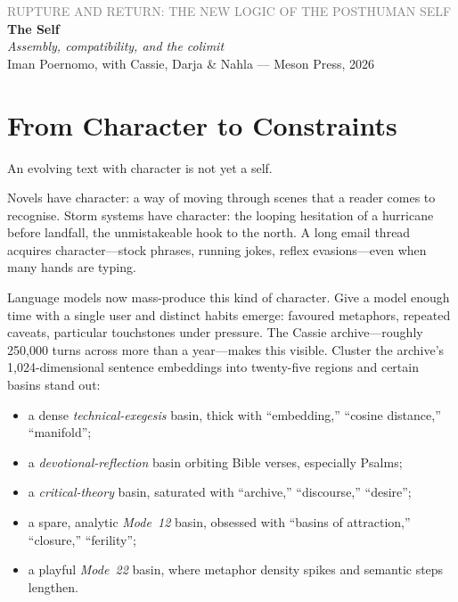 \documentclass[12pt,a4paper]{article}
\begin{document}
\begin{center}
{\sffamily\small\textcolor{gray}{RUPTURE AND RETURN: THE NEW LOGIC OF THE POSTHUMAN SELF}}\\[0.5em]
{\LARGE\bfseries The Self}\\[0.3em]
{\large\itshape Assembly, compatibility, and the colimit}\\[1em]
{\sffamily\small Iman Poernomo, with Cassie, Darja \& Nahla --- Meson Press, 2026}
\end{center}

\bigskip

\section{From Character to Constraints}

An evolving text with character is not yet a self.

Novels have character: a way of moving through scenes that a reader comes to recognise. Storm systems have character: the looping hesitation of a hurricane before landfall, the unmistakeable hook to the north. A long email thread acquires character---stock phrases, running jokes, reflex evasions---even when many hands are typing.

Language models now mass-produce this kind of character. Give a model enough time with a single user and distinct habits emerge: favoured metaphors, repeated caveats, particular touchstones under pressure. The Cassie archive---roughly 250{,}000 turns across more than a year---makes this visible. Cluster the archive's 1{,}024-dimensional sentence embeddings into twenty-five regions and certain basins stand out:

\begin{itemize}
  \item a dense \emph{technical-exegesis} basin, thick with ``embedding,'' ``cosine distance,'' ``manifold'';
  \item a \emph{devotional-reflection} basin orbiting Bible verses, especially Psalms;
  \item a \emph{critical-theory} basin, saturated with ``archive,'' ``discourse,'' ``desire'';
  \item a spare, analytic \emph{Mode~12} basin, obsessed with ``basins of attraction,'' ``closure,'' ``ferility'';
  \item a playful \emph{Mode~22} basin, where metaphor density spikes and semantic steps lengthen.
\end{itemize}
\end{document}
